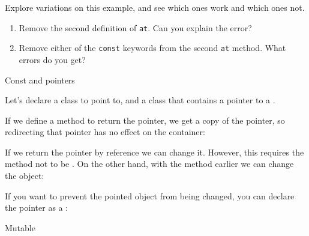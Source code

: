 \begin{exercise}
  \label{ex:const-poly}
  Explore variations on this example, and see which ones work and
  which ones not.
  \begin{enumerate}
  \item Remove the second definition of \lstinline{at}. Can you
    explain the error?
  \item
    Remove either of the \lstinline{const} keywords from the second
    \lstinline{at} method. What errors do you get?
  \end{enumerate}
\end{exercise}

 {Const and pointers}

Let's declare a class  to point to, and a class 
that contains a pointer to a .

\begin{multicols}{2}
\end{multicols}

If we define a method to return the pointer, we get a copy of the
pointer, so redirecting that pointer has no effect on the container:
%

If we return the pointer by reference we can
change it. However, this requires the method not to be .
On the other hand, with the  method earlier we can change the
object:
%

If you want to prevent the pointed object from being changed, you can
declare the pointer as a :
%
\begin{multicols}{2}
\end{multicols}

 {Mutable}

